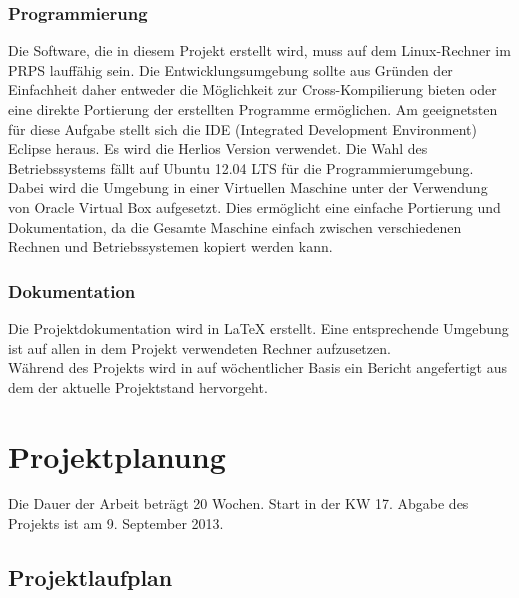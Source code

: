 \documentclass[a4paper,12pt,fleqn]{article}
\begin{document}
\subsubsection{Programmierung}
Die Software, die in diesem Projekt erstellt wird, muss auf dem Linux-Rechner im PRPS lauffähig sein. Die Entwicklungsumgebung sollte aus Gründen der Einfachheit daher entweder die Möglichkeit zur Cross-Kompilierung bieten oder eine direkte Portierung der erstellten Programme ermöglichen. Am geeignetsten für diese Aufgabe stellt sich die IDE (Integrated Development Environment) Eclipse heraus. Es wird die Herlios Version verwendet. Die Wahl des Betriebssystems fällt auf Ubuntu 12.04 LTS für die Programmierumgebung. Dabei wird die Umgebung in einer Virtuellen Maschine unter der Verwendung von Oracle Virtual Box aufgesetzt. Dies ermöglicht eine einfache Portierung und Dokumentation, da die Gesamte Maschine einfach zwischen verschiedenen Rechnen und Betriebssystemen kopiert werden kann.

\subsubsection{Dokumentation}
Die Projektdokumentation wird in \LaTeX{} erstellt. Eine entsprechende Umgebung ist auf allen in dem Projekt verwendeten Rechner aufzusetzen.\\
Während des Projekts wird in auf wöchentlicher Basis ein Bericht angefertigt aus dem der aktuelle Projektstand hervorgeht.

\section{Projektplanung}
Die Dauer der Arbeit beträgt 20 Wochen. Start in der KW 17. Abgabe des Projekts ist am 9. September 2013.
\subsection{Projektlaufplan}




\newpage


\end{document}
